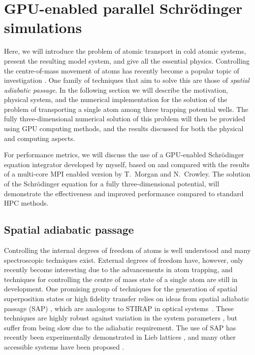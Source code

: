 \section{GPU-enabled parallel Schr\"odinger simulations}
\label{sec:3D_Stirap_parallel_Schrodinger_simulations}

Here, we will introduce the problem of atomic transport in cold atomic systems, present the resulting model system, and give all the essential physics. Controlling the centre-of-mass movement of atoms has recently become a popular topic of investigation \cite{AO:SAP_REVIEW_2016}. One family of techniques that aim to solve this are those of \textit{spatial adiabatic passage}. In the following section we will describe the motivation, physical system, and the numerical implementation for the solution of the problem of transporting a single atom among three trapping potential wells. The fully three-dimensional numerical solution of this problem will then be provided using GPU computing methods, and the results discussed for both the physical and computing aspects.

For performance metrics, we will discuss the use of a GPU-enabled Schr\"odinger equation integrator developed by myself, based on and compared with the results of a multi-core MPI enabled version by T.~Morgan and N.~Crowley. The solution of the Schr\"odinger equation for a fully three-dimensional potential, will demonstrate the effectiveness and improved performance compared to standard HPC methods.

\subsection{Spatial adiabatic passage}
Controlling the internal degrees of freedom of atoms is well understood and many spectroscopic techniques exist. External degrees of freedom have, however, only recently become interesting due to the advancements in atom trapping, and techniques for controlling the centre of mass state of a single atom are still in development. One promising group of techniques for the generation of spatial superposition states or high fidelity transfer relies on ideas from spatial adiabatic passage (SAP) \cite{AO:SAP_REVIEW_2016}, which are analogous to STIRAP in optical systems~\cite{AO:Bergmann_jcp_2015}. These techniques are highly robust against variation in the system parameters \cite{Eckert:04}, but suffer from being slow due to the adiabatic requirement. The use of SAP has recently been experimentally demonstrated in Lieb lattices \cite{AO:Taie_oist_2016}, and many other accessible systems have been proposed \cite{Eckert:06,Morgan:11,Kohler:13}.

